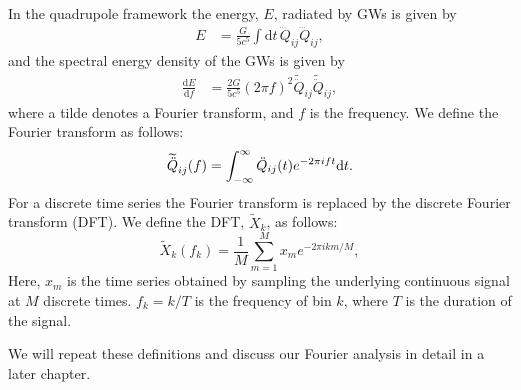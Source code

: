 In the quadrupole framework the energy, $E$, radiated by GWs is given by 
\begin{align}
E &=\frac{G}{5 c^5} \int \mathrm{d}t \, \dddot{Q}_{ij} \dddot{Q}_{ij},
\end{align}
and the spectral energy density of the GWs is given by 
\begin{align} \label{eqT:dedf}
\frac{\mathrm{d} E}{\mathrm{d} f} &= \frac{2G}{5 c^5} (2\pi f)^2 \widetilde{\ddot{Q}}_{ij} \widetilde{\ddot{Q}}_{ij},
\end{align}
where a tilde denotes a Fourier transform, and $f$ is the
frequency. We define the Fourier transform as follows:
\begin{equation}
\widetilde{\ddot{Q}}_{ij}(f) = \int_{-\infty}^{\infty} \ddot{Q}_{ij}(t) e^{-2 \pi i f t} \mathrm{d} t. 
\end{equation}
For a discrete time series the Fourier transform is replaced by the discrete Fourier transform (DFT).
We define the DFT, $\widetilde{X}_k$, as follows: 
\begin{equation} \label{eq:DFT}
\widetilde{X}_k (f_k) = \frac{1}{M}  \sum^M_{m=1} x_m e^{-2\pi i k m/M},
\end{equation}
Here, $x_m$ is the time series obtained by sampling the underlying continuous signal at $M$ discrete times. 
$f_k = k/T$ is the frequency of bin $k$, where $T$ is the duration of the signal.

We will repeat these definitions and discuss our Fourier analysis in detail in a later chapter. 